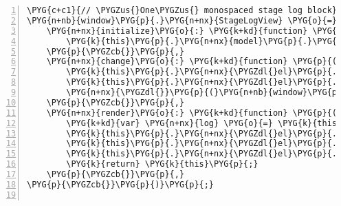 \begin{Verbatim}[commandchars=\\\{\},numbers=left,firstnumber=1,stepnumber=5]
\PYG{c+c1}{// \PYGZus{}One\PYGZus{} monospaced stage log block}
\PYG{n+nb}{window}\PYG{p}{.}\PYG{n+nx}{StageLogView} \PYG{o}{=} \PYG{n+nx}{Backbone}\PYG{p}{.}\PYG{n+nx}{View}\PYG{p}{.}\PYG{n+nx}{extend}\PYG{p}{(}\PYG{p}{\PYGZob{}}
    \PYG{n+nx}{initialize}\PYG{o}{:} \PYG{k+kd}{function} \PYG{p}{(}\PYG{p}{)} \PYG{p}{\PYGZob{}}
        \PYG{k}{this}\PYG{p}{.}\PYG{n+nx}{model}\PYG{p}{.}\PYG{n+nx}{bind}\PYG{p}{(}\PYG{l+s+s2}{"change"}\PYG{p}{,} \PYG{k}{this}\PYG{p}{.}\PYG{n+nx}{change}\PYG{p}{,} \PYG{k}{this}\PYG{p}{)}\PYG{p}{;}
    \PYG{p}{\PYGZcb{}}\PYG{p}{,}
    \PYG{n+nx}{change}\PYG{o}{:} \PYG{k+kd}{function} \PYG{p}{(}\PYG{n+nx}{model}\PYG{p}{,} \PYG{n+nx}{options}\PYG{p}{)} \PYG{p}{\PYGZob{}}
        \PYG{k}{this}\PYG{p}{.}\PYG{n+nx}{\PYGZdl{}el}\PYG{p}{.}\PYG{n+nx}{children}\PYG{p}{(}\PYG{l+s+s2}{"pre"}\PYG{p}{)}\PYG{p}{.}\PYG{n+nx}{text}\PYG{p}{(}\PYG{n+nx}{model}\PYG{p}{.}\PYG{n+nx}{get}\PYG{p}{(}\PYG{l+s+s1}{'text'}\PYG{p}{)}\PYG{p}{)}\PYG{p}{;}
        \PYG{k}{this}\PYG{p}{.}\PYG{n+nx}{\PYGZdl{}el}\PYG{p}{.}\PYG{n+nx}{scrollToBottom}\PYG{p}{(}\PYG{p}{)}\PYG{p}{;}
        \PYG{n+nx}{\PYGZdl{}}\PYG{p}{(}\PYG{n+nb}{window}\PYG{p}{)}\PYG{p}{.}\PYG{n+nx}{scrollspy}\PYG{p}{(}\PYG{l+s+s1}{'refresh'}\PYG{p}{)}\PYG{p}{;}
    \PYG{p}{\PYGZcb{}}\PYG{p}{,}
    \PYG{n+nx}{render}\PYG{o}{:} \PYG{k+kd}{function} \PYG{p}{(}\PYG{p}{)} \PYG{p}{\PYGZob{}}
        \PYG{k+kd}{var} \PYG{n+nx}{log} \PYG{o}{=} \PYG{k}{this}\PYG{p}{.}\PYG{n+nx}{model}\PYG{p}{.}\PYG{n+nx}{toJSON}\PYG{p}{(}\PYG{p}{)}\PYG{p}{;}
        \PYG{k}{this}\PYG{p}{.}\PYG{n+nx}{\PYGZdl{}el}\PYG{p}{.}\PYG{n+nx}{attr}\PYG{p}{(}\PYG{l+s+s1}{'id'}\PYG{p}{,} \PYG{n+nx}{log}\PYG{p}{.}\PYG{n+nx}{stage}\PYG{p}{)}\PYG{p}{;}
        \PYG{k}{this}\PYG{p}{.}\PYG{n+nx}{\PYGZdl{}el}\PYG{p}{.}\PYG{n+nx}{append}\PYG{p}{(}\PYG{n+nx}{el}\PYG{p}{.}\PYG{n+nx}{h4}\PYG{p}{(}\PYG{n+nx}{log}\PYG{p}{.}\PYG{n+nx}{stage}\PYG{p}{)}\PYG{p}{)}\PYG{p}{;}
        \PYG{k}{this}\PYG{p}{.}\PYG{n+nx}{\PYGZdl{}el}\PYG{p}{.}\PYG{n+nx}{append}\PYG{p}{(}\PYG{n+nx}{el}\PYG{p}{.}\PYG{n+nx}{pre}\PYG{p}{(}\PYG{n+nx}{log}\PYG{p}{.}\PYG{n+nx}{text}\PYG{p}{)}\PYG{p}{)}\PYG{p}{;}
        \PYG{k}{return} \PYG{k}{this}\PYG{p}{;}
    \PYG{p}{\PYGZcb{}}\PYG{p}{,}
\PYG{p}{\PYGZcb{}}\PYG{p}{)}\PYG{p}{;}


\end{Verbatim}
